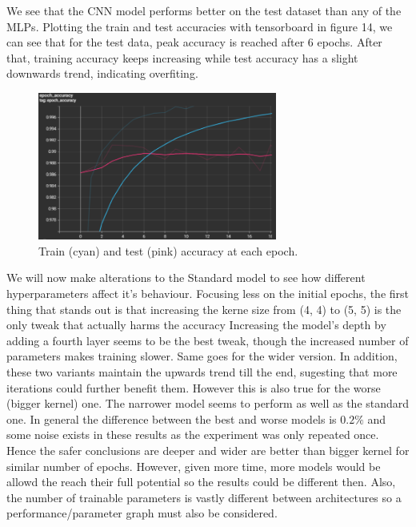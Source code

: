 \documentclass{article}
\begin{document}
We see that the CNN model performs better on the test dataset than any of the MLPs.
Plotting the train and test accuracies with tensorboard in figure 14, we can see that for the test data, peak accuracy is reached after 6 epochs.
After that, training accuracy keeps increasing while test accuracy has a slight downwards trend, indicating overfiting.

\begin{figure}[h!]
    \centering
    \includegraphics[width=0.7\textwidth]{./plots/screenshot9.png}
    \caption{Train (cyan) and test (pink) accuracy at each epoch.}
    \label{fig:plot16}
\end{figure}

We will now make alterations to the Standard model to see how different hyperparameters affect it's behaviour.
Focusing less on the initial epochs, the first thing that stands out is that increasing the kerne size from (4, 4) to (5, 5) is the only tweak that actually harms the accuracy
Increasing the model's depth by adding a fourth layer seems to be the best tweak, though the increased number of parameters makes training slower. 
Same goes for the wider version.
In addition, these two variants maintain the upwards trend till the end, sugesting that more iterations could further benefit them. However this is also true for the worse (bigger kernel) one.
The narrower model seems to perform as well as the standard one.
In general the difference between the best and worse models is \(0.2\%\) and some noise exists in these results as the experiment was only repeated once.
Hence the safer conclusions are deeper and wider are better than bigger kernel for similar number of epochs.
However, given more time, more models would be allowd the reach their full potential so the results could be different then.
Also, the number of trainable parameters is vastly different between architectures so a performance/parameter graph must also be considered.
\end{document}
